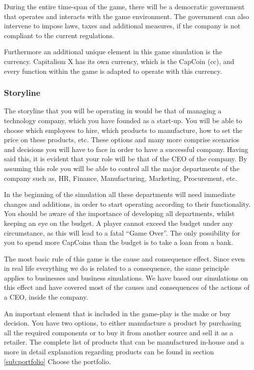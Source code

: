 \documentclass[11pt,titlepage,oneside,openany]{book}
\begin{document}
During the entire time-span of the game, there will be a democratic government that operates and interacts with the game environment. The government can also intervene to impose laws, taxes and additional measures, if the company is not compliant to the current regulations. 

Furthermore an additional unique element in this game simulation is the currency. Capitalism X has its own currency, which is the CapCoin (\gls{cc}), and every function within the game is adapted to operate with this currency.

\subsubsection{Storyline}
 The storyline that you will be operating in would be that of managing a technology company, which you have founded as a start-up. You will be able to choose which employees to hire, which products to manufacture,  how to set the price on these products, etc. These options and many more comprise scenarios and decisions you will have to face in order to have a successful company. Having said this, it is evident that your role will be that of the CEO of the company. By assuming this role you will be able to control all the major departments of the company such as, HR, Finance, Manufacturing, Marketing, Procurement, etc. 
 
In the beginning of the simulation all these departments will need immediate changes and additions, in order to start operating according to their functionality. You should be aware of the importance of developing all departments, whilst keeping an eye on the budget. A player cannot exceed the budget under any circumstance, as this will lead to a fatal “Game Over”. The only possibility for you to spend more CapCoins than the budget is to take a loan from a bank. 

The most basic rule of this game is the cause and consequence effect. Since even in real life everything we do is related to a consequence, the same principle applies to businesses and business simulations. We have based our simulations on this effect and have covered most of the causes and consequences of the actions of a CEO, inside the company. 

An important element that is included in the game-play is the make or buy decision. You have two options, to either manufacture a product by purchasing all the required components or to buy it from another source and sell it as a retailer. The complete list of products that can be manufactured in-house and a more in detail explanation regarding products can be found in section \ref{sub:portfolio} Choose the portfolio. 
\end{document}
